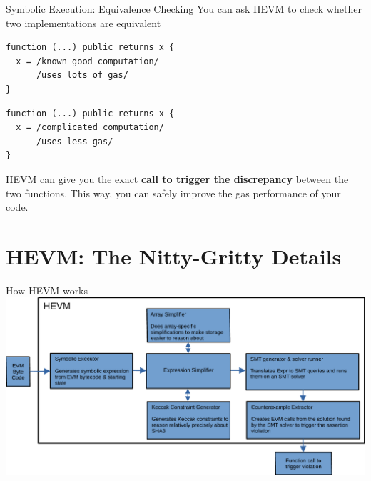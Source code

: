 \documentclass[aspectratio=169]{beamer}
\begin{document}
\begin{frame}[fragile=singleslide]{Symbolic Execution: Equivalence Checking}
You can ask HEVM to check whether two implementations are equivalent
\bigskip
\\

\begin{minipage}[b]{0.45\textwidth}
\begin{Verbatim}[frame=single, framerule=0.2mm, framesep=2mm,fontsize=\small]
function (...) public returns x {
  x = /known good computation/
      /uses lots of gas/
}
    \end{Verbatim}
  \end{minipage}
  \begin{minipage}[b]{0.45\textwidth}
  \begin{Verbatim}[frame=single, framerule=0.2mm, framesep=2mm,fontsize=\small]
function (...) public returns x {
  x = /complicated computation/
      /uses less gas/
}
\end{Verbatim}
\end{minipage}

HEVM can give you the exact \textbf{call to trigger the discrepancy} between the two functions. This way, you can safely improve the gas performance of your code.
\end{frame}

\section{HEVM: The Nitty-Gritty Details}
\begin{frame}{How HEVM works}
\centering
\includegraphics[scale=0.6]{HEVM-overview}

\end{frame}
\end{document}
